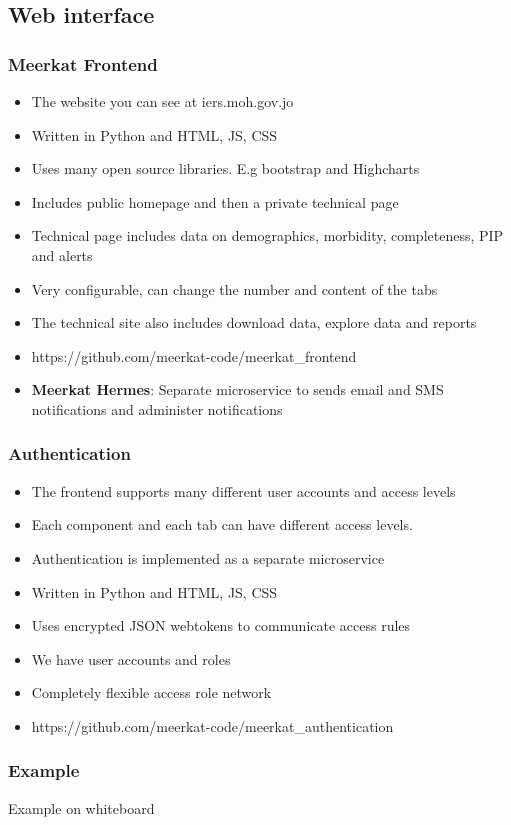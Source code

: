 \documentclass{beamer}
\begin{document}
\subsection{Web interface}
\begin{frame}
  \frametitle{Meerkat Frontend}
  \begin{itemize}
  \item The website you can see at iers.moh.gov.jo
  \item Written in Python and HTML, JS, CSS
  \item Uses many open source libraries. E.g bootstrap and Highcharts
  \item Includes public homepage and then a private technical page
  \item Technical page includes data on demographics, morbidity, completeness, PIP and alerts
  \item Very configurable, can change the number and content of the tabs
  \item The technical site also includes download data, explore data and reports
  \item https://github.com/meerkat-code/meerkat\_frontend
  \item {\bf Meerkat Hermes}: Separate microservice to sends email and SMS notifications and administer notifications
  \end{itemize}
\end{frame}
\begin{frame}
  \frametitle{Authentication}
  \begin{itemize}
  \item The frontend supports many different user accounts and access levels
  \item Each component and each tab can have different access levels. 
  \item Authentication is implemented as a separate microservice
  \item Written in Python and HTML, JS, CSS
  \item Uses encrypted JSON webtokens to communicate access rules
  \item We have user accounts and roles
  \item Completely flexible access role network
  \item https://github.com/meerkat-code/meerkat\_authentication
  \end{itemize}
\end{frame}


\begin{frame}
  \frametitle{Example}
  {\Huge Example on whiteboard}
\end{frame}
\end{document}
